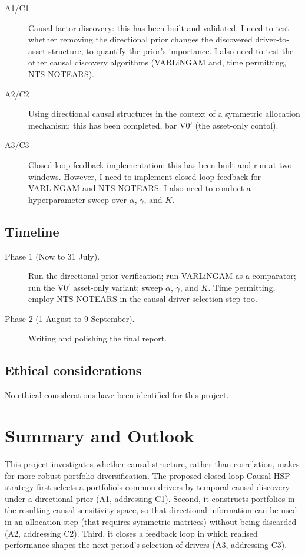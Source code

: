 \documentclass[12pt, a4paper]{report}
\begin{document}
\begin{description}
  \item[A1/C1] Causal factor discovery: this has been built and validated. I need to test whether removing the
        directional prior changes the discovered driver-to-asset structure, to quantify the prior's importance. I also need to test the other causal discovery algorithms (VARLiNGAM and, time permitting, NTS-NOTEARS).
  \item[A2/C2] Using directional causal structures in the context of a symmetric allocation mechanism: this has been completed, bar V0$'$ (the asset-only contol).
  \item[A3/C3] Closed-loop feedback implementation: this has been built and run at two windows. 
  However, I need to implement closed-loop feedback for VARLiNGAM and NTS-NOTEARS. I also need to conduct a hyperparameter sweep over $\alpha$, $\gamma$, and $K$.
\end{description}

\section{Timeline}
\label{sec:timeline}

\begin{description}
  \item[Phase 1 (Now to 31 July).] Run the directional-prior verification; run VARLiNGAM as a comparator; run the V0$'$ asset-only variant; sweep $\alpha$, $\gamma$, and $K$. 
  Time permitting, employ NTS-NOTEARS in the causal driver selection step too.
  \item[Phase 2 (1 August to 9 September).] Writing and polishing the final report.
\end{description}

\section{Ethical considerations}
\label{sec:ethics}

No ethical considerations have been identified for this project.

\chapter{Summary and Outlook}
\label{chap:conclusion}

This project investigates whether causal structure, rather than correlation, makes for more robust
portfolio diversification. 
The proposed closed-loop Causal-HSP strategy first selects a portfolio's common drivers
by temporal causal discovery under a directional prior (A1, addressing C1).
Second, it constructs portfolios
in the resulting causal sensitivity space,
so that directional information can be used in an allocation step (that requires symmetric matrices) without being discarded (A2, addressing C2).
Third, it closes a feedback loop in
which realised performance shapes the next period's selection of drivers (A3, addressing C3).
\end{document}
